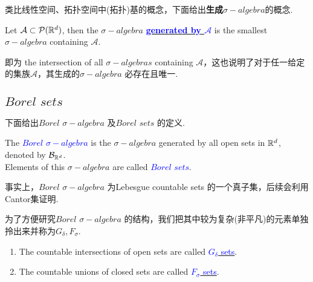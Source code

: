 	\vspace{2em}
	类比线性空间、拓扑空间中(拓扑)基的概念，下面给出\textbf{生成$\sigma-algebra$}的概念.
	\begin{defn}
		Let $\mathcal{A} \subset \mathcal{P}(\mathbb{R}^d)$, then the $\sigma-algebra$ \underline{\textcolor{blue}{\textbf{generated by $\mathcal{A}$}}} is the smallest $\sigma-algebra$ containing $\mathcal{A}$.
		
		\begin{rmk}
			即为 the intersection of all $\sigma-algebras$ containing $\mathcal{A}$，这也说明了对于任一给定的集族$\mathcal{A}$，其生成的$\sigma-algebra$ 必存在且唯一.
		\end{rmk}
	\end{defn}

\newpage
\subsection{$Borel \,\, sets$}
	下面给出$Borel \,\, \sigma-algebra$ 及$Borel \,\, sets$ 的定义.
	\begin{defn}
		The \underline{\textcolor{blue}{\textbf{$Borel \,\, \sigma-algebra$}}} is the $\sigma-algebra$ generated by all open sets in $\mathbb{R}^d$, \\
		denoted by \textcolor{blue}{$\mathcal{B}_{\mathbb{R}^d}$}.\\
		Elements of this $\sigma-algebra$ are called \underline{\textcolor{blue}{$Borel \,\, sets$}}.
		
		\begin{rmk}
			事实上，$Borel \,\, \sigma-algebra$ 为Lebesgue countable sets 的一个真子集，后续会利用Cantor集证明.
		\end{rmk}
	\end{defn}

	\vspace{2em}
	为了方便研究$Borel \,\, \sigma-algebra$ 的结构，我们把其中较为复杂(非平凡)的元素单独拎出来并称为$G_\delta , F_\sigma$.
	\begin{defn}
		\begin{enumerate}
			\item The countable intersections of open sets are called \underline{\textcolor{blue}{$G_\delta$ sets}}.
			
			\item The countable unions of closed sets are called \underline{\textcolor{blue}{$F_\sigma$ sets}}.
		\end{enumerate}
	\end{defn}
	
